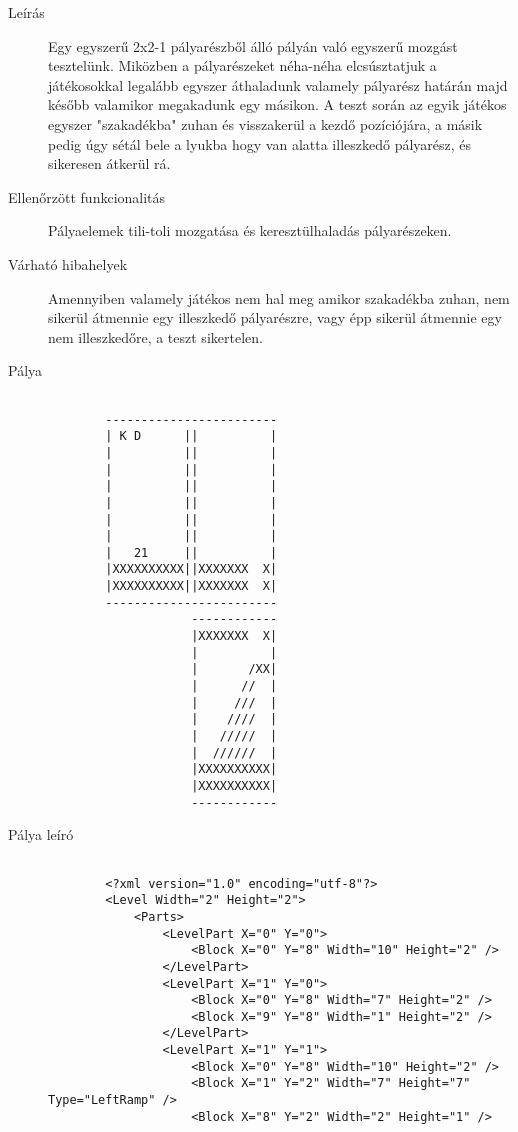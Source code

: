 \begin{description}
	
	\item[Leírás] Egy egyszerű 2x2-1 pályarészből álló pályán való egyszerű mozgást tesztelünk. Miközben a pályarészeket néha-néha elcsúsztatjuk a játékosokkal legalább egyszer áthaladunk valamely pályarész határán majd később valamikor megakadunk egy másikon. A teszt során az egyik játékos egyszer "szakadékba" zuhan és visszakerül a kezdő pozíciójára, a másik pedig úgy sétál bele a lyukba hogy van alatta illeszkedő pályarész, és sikeresen átkerül rá.
	
	\item[Ellenőrzött funkcionalitás] Pályaelemek tili-toli mozgatása és keresztülhaladás pályarészeken.
	
	\item[Várható hibahelyek] Amennyiben valamely játékos nem hal meg amikor szakadékba zuhan, nem sikerül átmennie egy illeszkedő pályarészre, vagy épp sikerül átmennie egy nem illeszkedőre, a teszt sikertelen.

	\item[Pálya]
	\begin{verbatim}
	
		------------------------
		| K D      ||          |
		|          ||          |
		|          ||          |
		|          ||          |
		|          ||          |
		|          ||          |
		|          ||          |
		|   21     ||          |
		|XXXXXXXXXX||XXXXXXX  X|
		|XXXXXXXXXX||XXXXXXX  X|
		------------------------
		            ------------
		            |XXXXXXX  X|
		            |          |
		            |       /XX|
		            |      //  |
		            |     ///  |
		            |    ////  |
		            |   /////  |
		            |  //////  |
		            |XXXXXXXXXX|
		            |XXXXXXXXXX|
		            ------------
	\end{verbatim}

	\item[Pálya leíró]
	\begin{verbatim}
	
		<?xml version="1.0" encoding="utf-8"?>
		<Level Width="2" Height="2">
		    <Parts>
		        <LevelPart X="0" Y="0">
		            <Block X="0" Y="8" Width="10" Height="2" />
		        </LevelPart>
		        <LevelPart X="1" Y="0">
		            <Block X="0" Y="8" Width="7" Height="2" />
		            <Block X="9" Y="8" Width="1" Height="2" />
		        </LevelPart>
		        <LevelPart X="1" Y="1">
		            <Block X="0" Y="8" Width="10" Height="2" />
		            <Block X="1" Y="2" Width="7" Height="7" Type="LeftRamp" />
		            <Block X="8" Y="2" Width="2" Height="1" />
		            

\end{verbatim}
\end{description}
